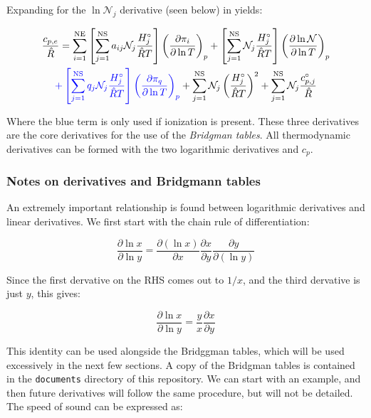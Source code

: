 \documentclass[10pt]{article}
\begin{document}
\begin{flushleft}
Expanding for the $\ln \mathcal{N}_j$ derivative (seen below) in yields:

\begin{multline}
\frac{c_{p,e}}{\hat{R}} = \sum_{i=1}^\text{NE} \left[ \sum_{j=1}^\text{NS} a_{ij} \mathcal{N}_j \frac{H_j^\circ}{\hat{R}T} \right] \left( \frac{\partial \pi_i}{\partial \ln T} \right)_p + \left[ \sum_{j=1}^\text{NS} \mathcal{N}_j \frac{H_j^\circ}{\hat{R}T} \right] \left( \frac{\partial \ln \mathcal{N}}{\partial \ln T} \right)_p \\ \textcolor{blue}{+ \left[\sum_{j=1}^\text{NS} q_j \mathcal{N}_j \frac{H_j^\circ}{\hat{R}T} \right] \left( \frac{\partial \pi_q}{\partial \ln T} \right)_p} + \sum_{j=1}^\text{NS} \mathcal{N}_j \left( \frac{H_j^\circ}{\hat{R}T} \right)^2 + \sum_{j=1}^\text{NS} \mathcal{N}_j \frac{c_{p,j}^\circ}{\hat{R}}
\end{multline}

Where the blue term is only used if ionization is present. These three derivatives are the core derivatives for the use of the \textit{Bridgman tables}. All thermodynamic derivatives can be formed with the two logarithmic derivatives and $c_p$.

\subsubsection{Notes on derivatives and Bridgmann tables}

An extremely important relationship is found between logarithmic derivatives and linear derivatives. We first start with the chain rule of differentiation:

\begin{equation}
    \frac{\partial \ln x}{\partial \ln y} = \frac{\partial (\ln x)}{\partial x} \frac{\partial x}{\partial y} \frac{\partial y}{\partial (\ln y)}
\end{equation}

Since the first dervative on the RHS comes out to $1/x$, and the third dervative is just $y$, this gives:

\begin{equation}
    \frac{\partial \ln x}{\partial \ln y} = \frac{y}{x} \frac{\partial x}{\partial y}
\end{equation}

This identity can be used alongside the Bridggman tables, which will be used excessively in the next few sections. A copy of the Bridgman tables is contained in the \verb|documents| directory of this repository. We can start with an example, and then future derivatives will follow the same procedure, but will not be detailed.
\vspace{5mm}
\\ The speed of sound can be expressed as:


\end{flushleft}
\end{document}
